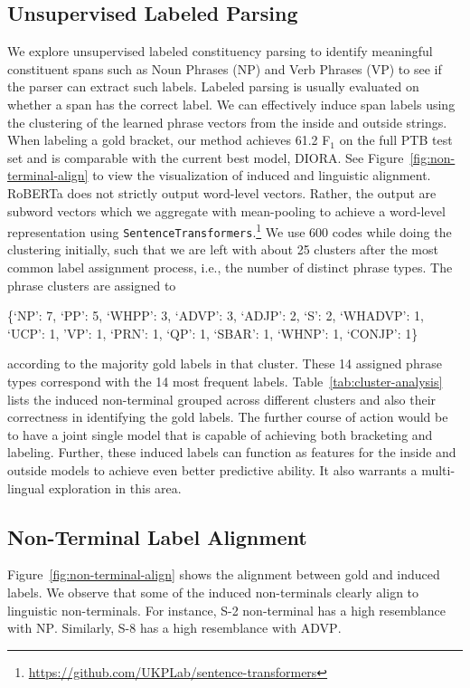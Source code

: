 \documentclass[11pt]{article}
\newcommand{\ptb}{\textsc{PTB}}
\newcommand{\roberta}{RoBERTa}
\begin{document}
\subsection{Unsupervised Labeled Parsing}
\label{appx:unsup-labeled-parsing}
We explore unsupervised labeled constituency parsing to identify meaningful constituent spans such as Noun Phrases (NP) and Verb Phrases (VP) to see if the parser can extract such labels. Labeled parsing is usually evaluated on whether a span has the correct label. We can effectively induce span labels using the clustering of the learned phrase vectors from the inside and outside strings. When labeling a gold bracket, our method achieves 61.2 F$_1$ on the full \ptb{} test set and is comparable with the current best model, DIORA. See Figure~\ref{fig:non-terminal-align} to view the visualization of induced and linguistic alignment.
\roberta{} does not strictly output word-level vectors. Rather, the output are subword vectors which we aggregate
with mean-pooling to achieve a word-level representation using \texttt{SentenceTransformers}.\footnote{\url{https://github.com/UKPLab/sentence-transformers}} We use 600 codes while doing the clustering initially, such that we are left with about 25 clusters after the most common label assignment process, i.e., the number of distinct phrase types. The phrase clusters are assigned to \begin{footnotesize}\textsc{\{`NP': 7, `PP': 5, `WHPP': 3, `ADVP': 3, `ADJP': 2, `S': 2, `WHADVP': 1, `UCP': 1, 'VP': 1, `PRN': 1, `QP': 1,
 `SBAR': 1, `WHNP': 1, `CONJP': 1\}}\end{footnotesize} according to the majority gold labels in that cluster. These 14 assigned phrase types correspond with the 14 most frequent labels. Table~\ref{tab:cluster-analysis}
 lists the induced non-terminal grouped across different clusters and also their correctness in identifying the gold labels. The further course of action would be to have a joint single model that is capable of achieving both bracketing and labeling. Further, these induced labels can function as features for the inside and outside models to achieve even better predictive ability. It also warrants a multi-lingual exploration in this area.


\subsection{Non-Terminal Label Alignment}
\label{appx:label-alignment}
Figure~\ref{fig:non-terminal-align} shows the alignment between gold and induced labels. We observe that some of the induced non-terminals clearly align to linguistic non-terminals. For instance, \textsc{S-2} non-terminal has a high resemblance with \textsc{NP}. Similarly, \textsc{S-8} has a high resemblance with \textsc{ADVP}. 
\end{document}
